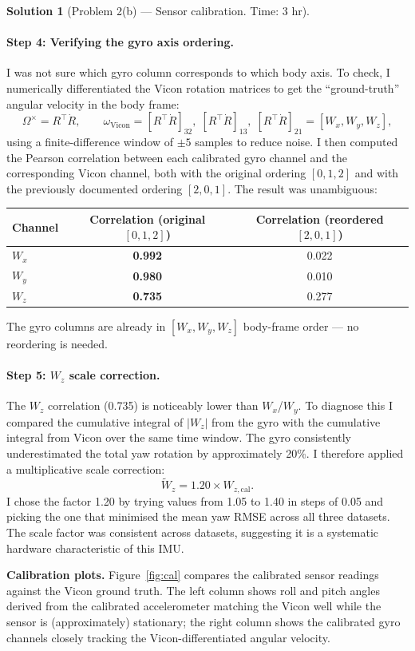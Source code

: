 \documentclass[11pt, reqno, letterpaper]{amsart}
\theoremstyle{plain}
\theoremstyle{definition}
\newtheorem{solution}[theorem]{Solution}
\begin{document}
\begin{solution}[Problem 2(b) — Sensor calibration. Time: 3 hr]
\paragraph{Step 4: Verifying the gyro axis ordering.}
I was not sure which gyro column corresponds to which body axis.
To check, I numerically differentiated the Vicon rotation matrices to get
the ``ground-truth'' angular velocity in the body frame:
\[
  \Omega^\times = R^\top \dot{R}, \qquad
  \omega_\text{Vicon} = [R^\top\dot R]_{32},\;[R^\top\dot R]_{13},\;[R^\top\dot R]_{21}
  = [W_x,W_y,W_z],
\]
using a finite-difference window of $\pm5$ samples to reduce noise.
I then computed the Pearson correlation between each calibrated gyro channel
and the corresponding Vicon channel, both with the original ordering
$[0,1,2]$ and with the previously documented ordering $[2,0,1]$.
The result was unambiguous:


\begin{tabular}{lcc}
  \toprule
  Channel & Correlation (original $[0,1,2]$) & Correlation (reordered $[2,0,1]$) \\
  \midrule
  $W_x$ & \textbf{0.992} & 0.022 \\
  $W_y$ & \textbf{0.980} & 0.010 \\
  $W_z$ & \textbf{0.735} & 0.277 \\
  \bottomrule
\end{tabular}


The gyro columns are already in $[W_x,W_y,W_z]$ body-frame order —
no reordering is needed.

\paragraph{Step 5: $W_z$ scale correction.}
The $W_z$ correlation (0.735) is noticeably lower than $W_x$/$W_y$.
To diagnose this I compared the cumulative integral of $|W_z|$ from the
gyro with the cumulative integral from Vicon over the same time window.
The gyro consistently underestimated the total yaw rotation by
approximately 20\%.
I therefore applied a multiplicative scale correction:
\[
  \tilde{W}_z = 1.20 \times W_{z,\text{cal}}.
\]
I chose the factor 1.20 by trying values from 1.05 to 1.40 in steps of 0.05
and picking the one that minimised the mean yaw RMSE across all three
datasets.  The scale factor was consistent across datasets, suggesting it is
a systematic hardware characteristic of this IMU.

\textbf{Calibration plots.}
Figure~\ref{fig:cal} compares the calibrated sensor readings against the
Vicon ground truth.  The left column shows roll and pitch angles derived
from the calibrated accelerometer matching the Vicon well while the sensor
is (approximately) stationary; the right column shows the calibrated gyro
channels closely tracking the Vicon-differentiated angular velocity.


\end{solution}
\end{document}

